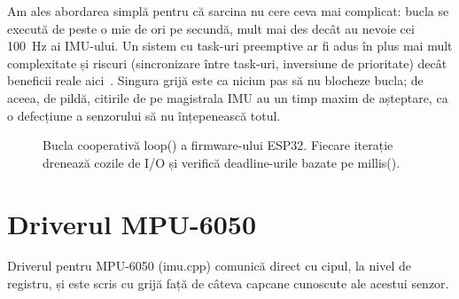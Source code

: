\documentclass[a4paper,12pt,twoside,openany]{report}
\renewcommand{\texttt}[1]{\textnormal{#1}}
\begin{document}
Am ales abordarea simplă pentru că sarcina nu cere ceva mai complicat: bucla se
execută de peste o mie de ori pe secundă, mult mai des decât au nevoie cei
\SI{100}{\hertz} ai IMU-ului. Un sistem cu task-uri preemptive ar fi adus în
plus mai mult complexitate și riscuri (sincronizare între task-uri, inversiune
de prioritate) decât beneficii reale aici~\cite{li2003realtime, barr1999embedded}.
Singura grijă este ca niciun pas să nu blocheze bucla; de aceea, de pildă,
citirile de pe magistrala IMU au un timp maxim de așteptare, ca o defecțiune a
senzorului să nu înțepenească totul.

\begin{figure}[H]
\centering
{}
\caption{Bucla cooperativă \texttt{loop()} a firmware-ului ESP32. Fiecare iterație drenează cozile de I/O și verifică deadline-urile bazate pe \texttt{millis()}.}
\label{fig:loop-firmware}
\end{figure}

\section{Driverul MPU-6050}
\label{sec:mpu-driver}

Driverul pentru MPU-6050 (\texttt{imu.cpp}) comunică direct cu cipul, la nivel
de registru, și este scris cu grijă față de câteva capcane cunoscute ale acestui
senzor.
\end{document}

